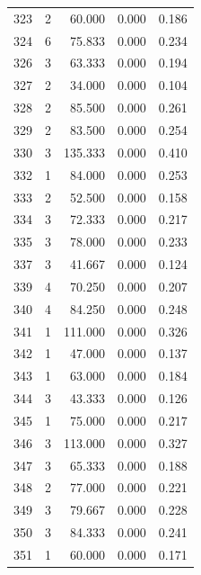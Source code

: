 \begin{table}
\begin{tabular}{rrrrr}
 323 &      2 &         60.000 &        0.000 &           0.186 \\
 324 &      6 &         75.833 &        0.000 &           0.234 \\
 326 &      3 &         63.333 &        0.000 &           0.194 \\
 327 &      2 &         34.000 &        0.000 &           0.104 \\
 328 &      2 &         85.500 &        0.000 &           0.261 \\
 329 &      2 &         83.500 &        0.000 &           0.254 \\
 330 &      3 &        135.333 &        0.000 &           0.410 \\
 332 &      1 &         84.000 &        0.000 &           0.253 \\
 333 &      2 &         52.500 &        0.000 &           0.158 \\
 334 &      3 &         72.333 &        0.000 &           0.217 \\
 335 &      3 &         78.000 &        0.000 &           0.233 \\
 337 &      3 &         41.667 &        0.000 &           0.124 \\
 339 &      4 &         70.250 &        0.000 &           0.207 \\
 340 &      4 &         84.250 &        0.000 &           0.248 \\
 341 &      1 &        111.000 &        0.000 &           0.326 \\
 342 &      1 &         47.000 &        0.000 &           0.137 \\
 343 &      1 &         63.000 &        0.000 &           0.184 \\
 344 &      3 &         43.333 &        0.000 &           0.126 \\
 345 &      1 &         75.000 &        0.000 &           0.217 \\
 346 &      3 &        113.000 &        0.000 &           0.327 \\
 347 &      3 &         65.333 &        0.000 &           0.188 \\
 348 &      2 &         77.000 &        0.000 &           0.221 \\
 349 &      3 &         79.667 &        0.000 &           0.228 \\
 350 &      3 &         84.333 &        0.000 &           0.241 \\
 351 &      1 &         60.000 &        0.000 &           0.171 \\

\end{tabular}
\end{table}
